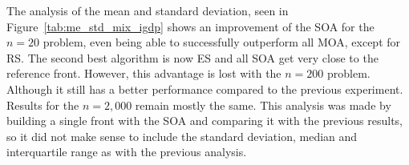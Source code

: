 The analysis of the mean and standard deviation, seen in Figure~\ref{tab:me_std_mix_igdp} shows an improvement of the SOA for the $n=20$ problem, even being able to successfully outperform all MOA, except for RS. The second best algorithm is now ES and all SOA get very close to the reference front. However, this advantage is lost with the $n=200$ problem. Although it still has a better performance compared to the previous experiment. Results for the $n=2,000$ remain mostly the same. This analysis was made by building a single front with the SOA and comparing it with the previous results, so it did not make sense to include the standard deviation, median and interquartile range as with the previous analysis.



